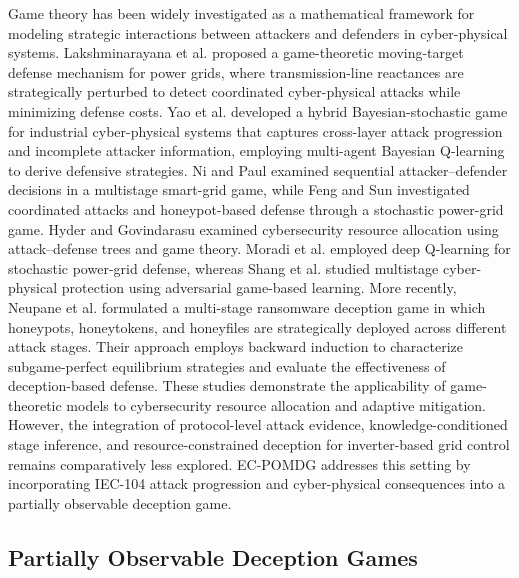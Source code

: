 \documentclass[10pt,conference]{IEEEtran}
\begin{document}
Game theory has been widely investigated as a mathematical framework for modeling strategic interactions between attackers and defenders in cyber-physical systems. Lakshminarayana et al. \cite{lakshminarayana2021movingtarget} proposed a game-theoretic moving-target defense mechanism for power grids, where transmission-line reactances are strategically perturbed to detect coordinated cyber-physical attacks while minimizing defense costs. Yao et al. \cite{yao2024bayesianstochastic} developed a hybrid Bayesian-stochastic game for industrial cyber-physical systems that captures cross-layer attack progression and incomplete attacker information, employing multi-agent Bayesian Q-learning to derive defensive strategies. Ni and Paul \cite{ni2019multistage} examined sequential attacker--defender decisions in a multistage smart-grid game, while Feng and Sun \cite{feng2020stochastic} investigated coordinated attacks and honeypot-based defense through a stochastic power-grid game. Hyder and Govindarasu \cite{HyderGame2022} examined cybersecurity resource allocation using attack--defense trees and game theory. Moradi et al. \cite{moradi2022deepqgrid} employed deep Q-learning for stochastic power-grid defense, whereas Shang et al. \cite{shang2025adversarial} studied multistage cyber-physical protection using adversarial game-based learning. More recently, Neupane et al. \cite{neupane2025ransomware} formulated a multi-stage ransomware deception game in which honeypots, honeytokens, and honeyfiles are strategically deployed across different attack stages. Their approach employs backward induction to characterize subgame-perfect equilibrium strategies and evaluate the effectiveness of deception-based defense. These studies demonstrate the applicability of game-theoretic models to cybersecurity resource allocation and adaptive mitigation. However, the integration of protocol-level attack evidence, knowledge-conditioned stage inference, and resource-constrained deception for inverter-based grid control remains comparatively less explored. EC-POMDG addresses this setting by incorporating IEC-104 attack progression and cyber-physical consequences into a partially observable deception game.

\subsection{Partially Observable Deception Games}
\end{document}
